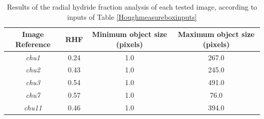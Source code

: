 \documentclass{article}
\begin{document}
    \begin{table}[ht]
	    \begin{center}
	    \begin{tabular}{ |c|c|c|c| } 
		    \hline
		    \textbf{Image Reference} & \textbf{RHF} & \textbf{Minimum object size (pixels)} & \textbf{Maximum object size (pixels)} \\
		    \hline
		    \textit{chu1} & 0.24 & 1.0 & 267.0 \\
		    \hline
		    \textit{chu2} & 0.43 & 1.0 & 245.0 \\
		    \hline
		    \textit{chu3} & 0.54 & 1.0 & 491.0 \\ 
		    \hline
		    \textit{chu7} & 0.57 & 1.0 & 76.0 \\ 
		    \hline
		    \textit{chu11} & 0.46 & 1.0 & 394.0 \\ 
		    \hline
	    \end{tabular}
	    \caption{Results of the radial hydride fraction analysis of each tested image, according to inputs of Table \ref{Houghmeasureboxinputs}}
	    \end{center}
	    \label{tab:RHF_results}
    \end{table}
\end{document}
